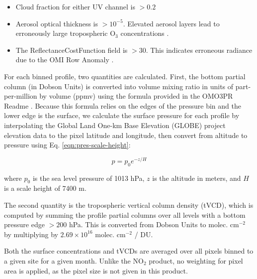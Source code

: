 \documentclass[a4paper,10pt,oneside]{article}
\newcommand{\ce}[1]{$\mathrm{#1}$}
\begin{document}
\begin{sloppy}
	\begin{itemize}
	\item Cloud fraction for either UV channel is $> 0.2$
	\item Aerosol optical thickness is $> 10^{-5}$. Elevated aerosol layers lead to erroneously large tropospheric \ce{O_3} concentrations \cite{omo3pr-readme}.
	\item The ReflectanceCostFunction field is $> 30$. This indicates erroneous radiance due to the OMI Row Anomaly \cite{row-anomaly}.
	\end{itemize}
	
	For each binned profile, two quantities are calculated. First, the bottom partial column (in Dobson Units) is converted into volume mixing ratio in units of part-per-million by volume (ppmv) using the formula provided in the OMO3PR Readme \cite{omo3pr-readme}. Because this formula relies on the edges of the pressure bin and the lower edge is the surface, we calculate the surface pressure for each profile by interpolating the Global Land One-km Base Elevation (GLOBE) project elevation data \cite{globe} to the pixel latitude and longitude, then convert from altitude to pressure using Eq. \eqref{eqn:pres-scale-height}:
	
	\begin{equation}
	\label{eqn:pres-scale-height}
	p = p_0 e^{-z/H}
	\end{equation}
	
	where $p_0$ is the sea level pressure of 1013 hPa, $z$ is the altitude in meters, and $H$ is a scale height of 7400 m.
	
	The second quantity is the tropospheric vertical column density (tVCD), which is computed by summing the profile partial columns over all levels with a bottom pressure edge $> 200$ hPa. This is converted from Dobson Units to molec. cm$^{-2}$ by multiplying by $2.69 \times 10^{16}$
molec. cm$^{-2}$ / DU. 

	Both the surface concentrations and tVCDs are averaged over all pixels binned to a given site for a given month. Unlike the \ce{NO_2} product, no weighting for pixel area is applied, as the pixel size is not given in this product.
	 

\end{sloppy}
\end{document}
